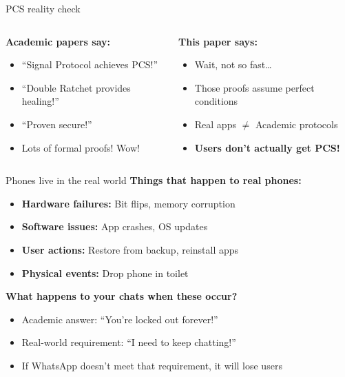 \documentclass[aspectratio=169, lualatex, handout]{beamer}
\begin{document}
\begin{frame}{PCS reality check}
	\begin{columns}[c]
		\begin{column}{0.5\textwidth}
			\textbf{Academic papers say:}
			\begin{itemize}
				\item ``Signal Protocol achieves PCS!''
				\item ``Double Ratchet provides healing!''
				\item ``Proven secure!''
				\item Lots of formal proofs! Wow!
			\end{itemize}
		\end{column}
		\begin{column}{0.5\textwidth}
			\textbf{This paper says:}
			\begin{itemize}
				\item Wait, not so fast\ldots
				\item Those proofs assume perfect conditions
				\item Real apps $\neq$ Academic protocols
				\item \textbf{Users don't actually get PCS!}
			\end{itemize}
		\end{column}
	\end{columns}
\end{frame}

\begin{frame}{Phones live in the real world}
	\textbf{Things that happen to real phones:}
	\begin{itemize}
		\item \textbf{Hardware failures:} Bit flips, memory corruption
		\item \textbf{Software issues:} App crashes, OS updates
		\item \textbf{User actions:} Restore from backup, reinstall apps
		\item \textbf{Physical events:} Drop phone in toilet
	\end{itemize}
	\textbf{What happens to your chats when these occur?}
	\begin{itemize}
		\item Academic answer: ``You're locked out forever!''
		\item Real-world requirement: ``I need to keep chatting!''
		\item If WhatsApp doesn't meet that requirement, it will lose users
	\end{itemize}
\end{frame}
\end{document}
